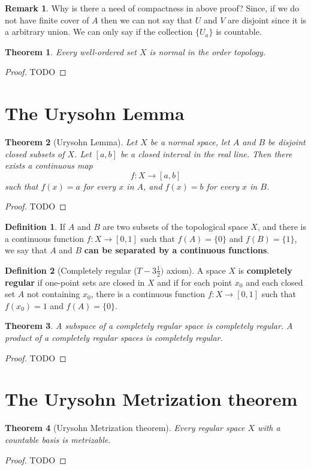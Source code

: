 \documentclass[12pt,reqno]{amsart}
\theoremstyle{plain}
\newtheorem{thm}{Theorem}
\theoremstyle{definition}
\newtheorem{defn}{Definition}
\newtheorem{rem}{Remark}
\begin{document}
\begin{rem}
    Why is there a need of compactness in above proof? Since, if we do not have finite cover of $A$ then we can not say that $U$ and $V$ are disjoint since it is a arbitrary union. We can only say if the collection $\{U_a\}$ is countable.
\end{rem}
\begin{thm}
    Every {\it well-ordered} set $X$ is normal in the order topology.
\end{thm}
\begin{proof}
    TODO
\end{proof}
\section{The Urysohn Lemma}
\begin{thm}[Urysohn Lemma]
    Let $X$ be a normal space, let $A$ and $B$ be disjoint closed subsets of $X$. Let $[a,b]$ be a closed interval in the real line. Then there exists a continuous map 
    $$ f \colon X \to [a,b]$$
    such that $f(x)=a$ for every $x$ in $A$, and $f(x)=b$ for every $x$ in $B$.    
\end{thm}
\begin{proof}
    TODO
\end{proof}
\begin{defn}
    If $A$ and $B$ are two subsets of the topological space $X$, and there is a continuous function $f \colon X \to [0,1]$ such that $f(A) = \{0\}$ and $f(B) = \{1\}$, we say that $A$ and $B$ {\bf can be separated by a continuous functions}.
\end{defn}
\begin{defn}[Completely regular ($T-3\frac{1}{2})$ axiom]
    A space $X$ is {\bf completely regular} if one-point sets are closed in $X$ and if for each point $x_0$ and each closed set $A$ not containing $x_0$, there is a continuous function $f \colon X \to [0,1]$ such that $f(x_0) = 1$ and $f(A) = \{0\}$.
\end{defn}
\begin{thm}
    A subspace of a completely regular space is completely regular. A product of a completely regular spaces is completely regular.
\end{thm}
\begin{proof}
    TODO
\end{proof}

\section{The Urysohn Metrization theorem}
\begin{thm}[Urysohn Metrization theorem]
    Every regular space $X$ with a countable basis is metrizable.
\end{thm}
\begin{proof}
    TODO
\end{proof}
\end{document}
